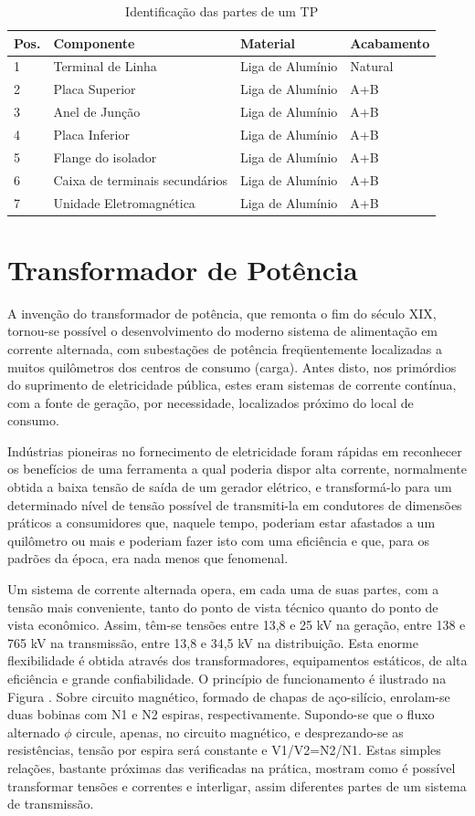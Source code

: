 \documentclass[a5paper,english,spanish,brazil]{ufsc-thesis}
\begin{document}
\begin{longtable}{|l|l|l|l|}
\caption{Identificação das partes de um TP}
\\ \hline
  Pos. & Componente & Material & Acabamento \\ \hline
  1 & Terminal de Linha & Liga de Alumínio & Natural \\ \hline
  2 & Placa Superior & Liga de Alumínio & A+B \\ \hline
  3 & Anel de Junção & Liga de Alumínio & A+B \\ \hline
  4 & Placa Inferior & Liga de Alumínio & A+B \\ \hline
  5 & Flange do isolador & Liga de Alumínio & A+B \\ \hline
  6 & Caixa de terminais secundários & Liga de Alumínio & A+B \\ \hline
  7 & Unidade Eletromagnética & Liga de Alumínio & A+B \\ \hline
\end{longtable}

\section{Transformador de Potência}
A invenção do transformador de potência, que remonta o fim do século XIX, tornou-se possível o desenvolvimento do moderno sistema de alimentação em corrente alternada, com subestações de potência freqüentemente localizadas a muitos quilômetros dos centros de consumo (carga). Antes disto, nos primórdios do suprimento de eletricidade pública, estes eram sistemas de corrente contínua, com a fonte de geração, por necessidade, localizados próximo do local de consumo.\par
Indústrias pioneiras no fornecimento de eletricidade foram rápidas em reconhecer os benefícios de uma ferramenta a qual poderia dispor alta corrente, normalmente obtida a baixa tensão de saída de um gerador elétrico, e transformá-lo para um determinado nível de tensão possível de transmiti-la em condutores de dimensões práticos a consumidores que, naquele tempo, poderiam estar afastados a um quilômetro ou mais e poderiam fazer isto com uma eficiência e que, para os padrões da época, era nada menos que fenomenal.\par
Um sistema de corrente alternada opera, em cada uma de suas partes, com a tensão mais conveniente, tanto do ponto de vista técnico quanto do ponto de vista econômico. Assim, têm-se tensões entre 13,8 e 25 kV na geração, entre 138 e 765 kV na transmissão, entre 13,8 e 34,5 kV na distribuição. Esta enorme flexibilidade é obtida através dos transformadores, equipamentos estáticos, de alta eficiência e grande confiabilidade. O princípio de funcionamento é ilustrado na Figura . Sobre circuito magnético, formado de chapas de aço-silício, enrolam-se duas bobinas com N1 e N2 espiras, respectivamente. Supondo-se que o fluxo alternado $\phi$ circule, apenas, no circuito magnético, e desprezando-se as resistências, tensão por espira será constante e V1/V2=N2/N1. Estas simples relações, bastante próximas das verificadas na prática, mostram como é possível transformar tensões e correntes e interligar, assim diferentes partes de um sistema de transmissão.
\end{document}
